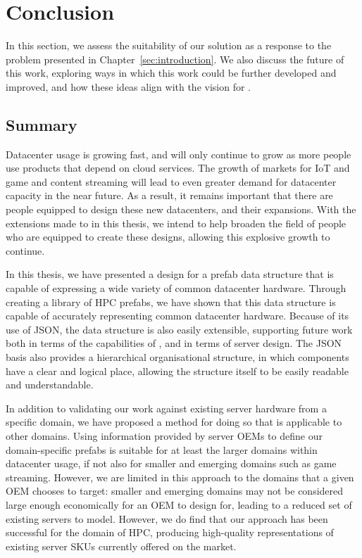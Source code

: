 \documentclass[11pt]{article}
\begin{document}
\newpage

\section{Conclusion} \label{sec:conclusion}
	In this section, we assess the suitability of our solution as a response to the problem presented in Chapter~\ref{sec:introduction}.
	We also discuss the future of this work, exploring ways in which this work could be further developed and improved, and how these ideas align with the vision for \opendc{} \cite{Iosup2017}.

	\subsection{Summary}
		Datacenter usage is growing fast, and will only continue to grow as more people use products that depend on cloud services.
		The growth of markets for IoT and game and content streaming will lead to even greater demand for datacenter capacity in the near future.
		As a result, it remains important that there are people equipped to design these new datacenters, and their expansions.
		With the extensions made to \opendc{} in this thesis, we intend to help broaden the field of people who are equipped to create these designs, allowing this explosive growth to continue.

		In this thesis, we have presented a design for a prefab data structure that is capable of expressing a wide variety of common datacenter hardware.
		Through creating a library of HPC prefabs, we have shown that this data structure is capable of accurately representing common datacenter hardware.
		Because of its use of JSON, the data structure is also easily extensible, supporting future work both in terms of the capabilities of \opendc{}, and in terms of server design.
		The JSON basis also provides a hierarchical organisational structure, in which components have a clear and logical place, allowing the structure itself to be easily readable and understandable.
		
		In addition to validating our work against existing server hardware from a specific domain, we have proposed a method for doing so that is applicable to other domains.
		Using information provided by server OEMs to define our domain-specific prefabs is suitable for at least the larger domains within datacenter usage, if not also for smaller and emerging domains such as game streaming.
		However, we are limited in this approach to the domains that a given OEM chooses to target: smaller and emerging domains may not be considered large enough economically for an OEM to design for, leading to a reduced set of existing servers to model.
		However, we do find that our approach has been successful for the domain of HPC, producing high-quality representations of existing server SKUs currently offered on the market.
\end{document}
